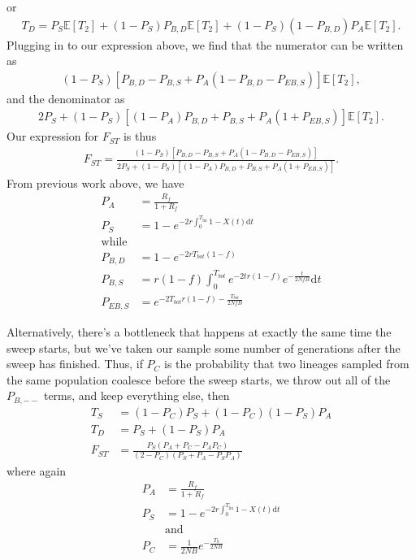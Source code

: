 \documentclass[reqno]{amsart}
\begin{document}
or
\begin{align}
	T_D = P_{S} \mathbb{E}[T_2] + (1-P_{S})P_{B,D}\mathbb{E}[T_2] + (1-P_{S})(1-P_{B,D})P_{A}\mathbb{E}[T_2].
\end{align}
Plugging in to our expression above, we find that the numerator can be written as
\begin{align}
	(1-P_S)[P_{B,D} - P_{B,S} + P_A(1- P_{B,D} - P_{EB,S})]\mathbb{E}[T_2],
\end{align}
and the denominator as
\begin{align}
	2P_S + (1-P_S)[(1-P_A)P_{B,D} + P_{B,S} + P_A(1 + P_{EB,S})]\mathbb{E}[T_2].
\end{align}
Our expression for $F_{ST}$ is thus
\begin{align}
	F_{ST} = \frac{(1-P_S)[P_{B,D} - P_{B,S} + P_A(1- P_{B,D} - P_{EB,S})]}{2P_S + (1-P_S)[(1-P_A)P_{B,D} + P_{B,S} + P_A(1 + P_{EB,S})]}.
\end{align}
From previous work above, we have
\begin{align}
	P_A &= \frac{R_f}{1+R_f} \\
	P_S &= 1 - e^{-2r\int_0^{T_{\text{fix}}}1-X(t)\mathrm{d}t} \\
	\text{while}\\
	P_{B,D} &= 1-  e^{-2rT_{bot}(1-f)} \\
	P_{B,S} &= r(1-f)\int_0^{T_{bot}}e^{-2tr(1-f)}e^{-\frac{t}{2NfB}}\mathrm{d}t\\
	P_{EB,S} &= e^{-2T_{bot}r(1-f)-\frac{T_{bot}}{2NfB}}
\end{align}

Alternatively, there's a bottleneck that happens at exactly the same time the sweep starts, but we've taken our sample some number of generations after the sweep has finished. Thus, if $P_C$ is the probability that two lineages sampled from the same population coalesce before the sweep starts, we throw out all of the $P_{B,--}$ terms, and keep everything else, then
\begin{align}
	T_S &= (1-P_C)P_S + (1-P_C)(1-P_S)P_A \\
	T_D &= P_S + (1-P_S)P_A \\
	F_{ST} &= \frac{P_S\left(P_A + P_C - P_A P_C\right)}{\left(2-P_C\right)\left(P_S + P_A - P_S P_A\right)} 
\end{align}
where again
\begin{align}
	P_A &= \frac{R_f}{1+R_f} \\
	P_S &= 1 - e^{-2r\int_0^{T_{\text{fix}}}1-X(t)\mathrm{d}t} \\
	&\text{and} \\
	P_C & = \frac{1}{2NB}e^{-\frac{T_0}{2NB}}
\end{align}
\end{document}
